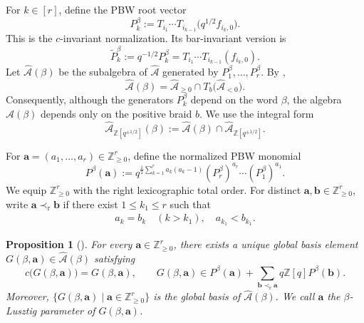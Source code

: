\documentclass[12pt, reqno]{amsart}
\theoremstyle{plain}
\newtheorem{proposition}[theorem]{Proposition}
\theoremstyle{definition}
\numberwithin{equation}{section}
\newcommand{\ZZ}{\mathbb{Z}}
\newcommand{\cA}{\mathcal{A}}
\begin{document}
For \(k\in[r]\), define the PBW root vector
\begin{equation}\label{eq:PBW-root-vector}
    P_k^\beta
    :=T_{i_1}\cdots T_{i_{k-1}}\bigl(q^{1/2}f_{i_k,0}\bigr).
\end{equation}
This is the \(c\)-invariant normalization. Its bar-invariant version is
\begin{equation}\label{eq:bar-normalized-PBW-root-vector}
    \widetilde P_k^\beta
    :=q^{-1/2}P_k^\beta
    =T_{i_1}\cdots T_{i_{k-1}}(f_{i_k,0}).
\end{equation}
Let \(\widehat{\cA}(\beta)\) be the subalgebra of
\(\widehat{\cA}\) generated by \(P_1^\beta,\ldots,P_r^\beta\). By
\cite[Proposition~4.7]{kashiwara2024braid},
\begin{equation}\label{eq:PBW-subalgebra-intersection}
    \widehat{\cA}(\beta)
    =\widehat{\cA}_{\geq0}
     \cap T_b\bigl(\widehat{\cA}_{<0}\bigr).
\end{equation}
Consequently, although the generators \(P_k^\beta\) depend on the word
\(\beta\), the algebra \(\widehat{\cA}(\beta)\) depends only on the
positive braid \(b\). We use the integral form
\begin{equation}\label{eq:integral-form-PBW-subalgebra}
    \widehat{\cA}_{\ZZ[q^{\pm1/2}]}(\beta)
    :=\widehat{\cA}(\beta)
      \cap\widehat{\cA}_{\ZZ[q^{\pm1/2}]}.
\end{equation}

For \(\mathbf a=(a_1,\ldots,a_r)\in\ZZ_{\geq0}^r\), define the
normalized PBW monomial
\begin{equation}\label{eq:normalized-PBW-monomial}
    P^\beta(\mathbf a)
    :=q^{\frac12\sum_{k=1}^r a_k(a_k-1)}
      (P_r^\beta)^{a_r}\cdots(P_1^\beta)^{a_1}.
\end{equation}
We equip \(\ZZ_{\geq0}^r\) with the right lexicographic total order. For
distinct \(\mathbf a,\mathbf b\in\ZZ_{\geq0}^r\), write
\(\mathbf a\prec_{\mathrm r}\mathbf b\) if there exist
\(1\leq k_1\leq r\) such that
\begin{align}
    a_k=b_k\quad(k>k_1), \quad a_{k_1}<b_{k_1}.
    \label{eq:order2}
\end{align}

\begin{proposition}[{\cite[Lemmas~4.16 and~4.17]
    {kashiwara2024braid}}]\label{prop:PBW-global-basis}
    For every \(\mathbf a\in\ZZ_{\geq0}^r\), there exists a unique
    global basis element
    \(G(\beta,\mathbf a)\in\widehat{\cA}(\beta)\) satisfying
    \begin{equation}\label{eq:PBW-global-basis-triangularity}
        c\bigl(G(\beta,\mathbf a)\bigr)=G(\beta,\mathbf a),
        \qquad
        G(\beta,\mathbf a)
        \in P^\beta(\mathbf a)
        +\sum_{\mathbf b\prec_{\mathrm r}\mathbf a}q\ZZ[q]P^\beta(\mathbf b).
    \end{equation}
    Moreover,
    \(\{G(\beta,\mathbf a)\mid
       \mathbf a\in\ZZ_{\geq0}^r\}\)
    is the global basis of \(\widehat{\cA}(\beta)\). We call
    \(\mathbf a\) the \(\beta\)-Lusztig parameter of
    \(G(\beta,\mathbf a)\).
\end{proposition}
\end{document}
